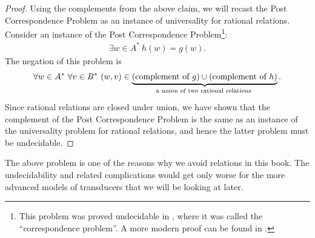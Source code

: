 \begin{proof}
    Using the complements from the above claim, we will recast the  Post Correspondence Problem as an instance of universality for rational relations. Consider an instance of the Post Correspondence Problem\footnote{This problem was proved undecidable in 
        \cite[p.264]{Post1946}, where it was  called the ``correspondence problem''. A more modern proof can be found in \cite[Theorem 5.15]{Sipser2012}.
    }:
    \begin{align*}
    \exists w \in A^* \ h(w) = g(w).
    \end{align*}
    The negation of this problem is 
    \begin{align*}
    \forall w \in A^*\  \forall v \in B^*\ (w,v) \in \myunderbrace{\text{(complement of $g$)} \cup \text{(complement of $h$)}}{a union of two rational relations}.
    \end{align*}
    Since rational relations are closed under union,  we have shown that the complement of the Post Correspondence Problem is the same as an instance of the  universality problem for  rational relations, and hence the latter problem must be undecidable.
\end{proof}

The above problem is one of the reasons why we avoid relations in this book. The undecidability and related complications would get only worse for the more advanced models of transducers that we will be looking at later.





\exerciseheader 

